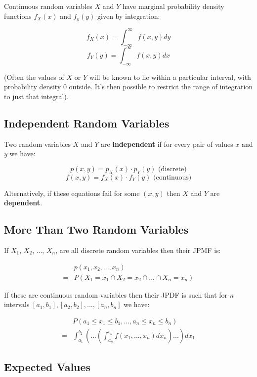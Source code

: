 Continuous random variables $X$ and $Y$ have marginal probability density functions $f_X(x)$ and $f_y(y)$ given by integration:

$$ f_X(x) = \int_{-\infty}^{\infty} f(x,y) dy $$
$$ f_Y(y) = \int_{-\infty}^{\infty} f(x,y) dx $$

(Often the values of $X$ or $Y$ will be known to lie within a particular interval, with probability density $0$ outside. It's then possible to restrict the range of integration to just that integral).

\subsection{Independent Random Variables}

Two random variables $X$ and $Y$ are \textbf{independent} if for every pair of values $x$ and $y$ we have:

$$ p(x,y) = p_X(x) \cdot p_Y(y) \text{ (discrete)} $$
$$ f(x,y) = f_X(x) \cdot f_Y(y) \text{ (continuous)} $$

Alternatively, if these equations fail for some $(x,y)$ then $X$ and $Y$ are \textbf{dependent}.

\subsection{More Than Two Random Variables}

If $X_1$, $X_2$, ..., $X_n$, are all discrete random variables then their JPMF is:

\begin{align*}
      & p(x_1,x_2,...,x_n)                            \\
    = & P(X_1=x_1 \cap X_2=x_2 \cap ... \cap X_n=x_n)
\end{align*}

If these are continuous random variables then their JPDF is such that for $n$ intervals $[a_1,b_1], [a_2,b_2],...,[a_n,b_n]$ we have:

\begin{align*}
      & P(a_1 \leq x_1 \leq b_1,...,a_n\leq x_n \leq b_n)                                      \\
    = & \int_{a_1}^{b_2}\left(...\left(\int_{a_n}^{b_n}f(x_1,...,x_n)dx_n\right)...\right)dx_1
\end{align*}

\subsection{Expected Values}

